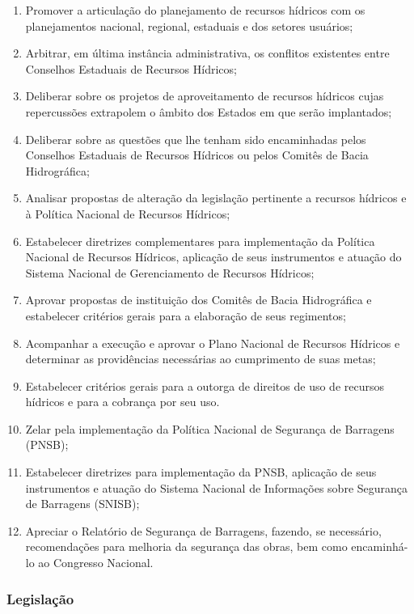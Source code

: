 \begin{enumerate}
\item 
Promover a articulação do planejamento de recursos hídricos com
os planejamentos nacional, regional, estaduais e dos setores
usuários;
\item 
Arbitrar, em última instância administrativa, os conflitos
existentes entre Conselhos Estaduais de Recursos Hídricos;
\item 
Deliberar sobre os projetos de aproveitamento de recursos hídricos
cujas repercussões extrapolem o âmbito dos Estados em que serão
implantados;
\item 
Deliberar sobre as questões que lhe tenham sido encaminhadas pelos
Conselhos Estaduais de Recursos Hídricos ou pelos Comitês de Bacia
Hidrográfica;
\item 
Analisar propostas de alteração da legislação pertinente a
recursos hídricos e à Política Nacional de Recursos Hídricos;
\item 
Estabelecer diretrizes complementares para implementação da
Política Nacional de Recursos Hídricos, aplicação de seus
instrumentos e atuação do Sistema Nacional de Gerenciamento de
Recursos Hídricos;
\item 
Aprovar propostas de instituição dos Comitês de Bacia
Hidrográfica e estabelecer critérios gerais para a elaboração
de seus regimentos;
\item 
Acompanhar a execução e aprovar o Plano Nacional de Recursos
Hídricos e determinar as providências necessárias ao cumprimento
de suas metas;
\item 
Estabelecer critérios gerais para a outorga de direitos de uso de
recursos hídricos e para a cobrança por seu uso.
\item 
Zelar pela implementação da Política Nacional de Segurança
de Barragens (PNSB);
\item 
Estabelecer diretrizes para implementação da PNSB, aplicação
de seus instrumentos e atuação do Sistema Nacional de
Informações sobre Segurança de Barragens (SNISB);
\item 
Apreciar o Relatório de Segurança de Barragens, fazendo, se
necessário, recomendações para melhoria da segurança das
obras, bem como encaminhá-lo ao Congresso Nacional.
\end{enumerate}

\subsubsection*{Legislação}

